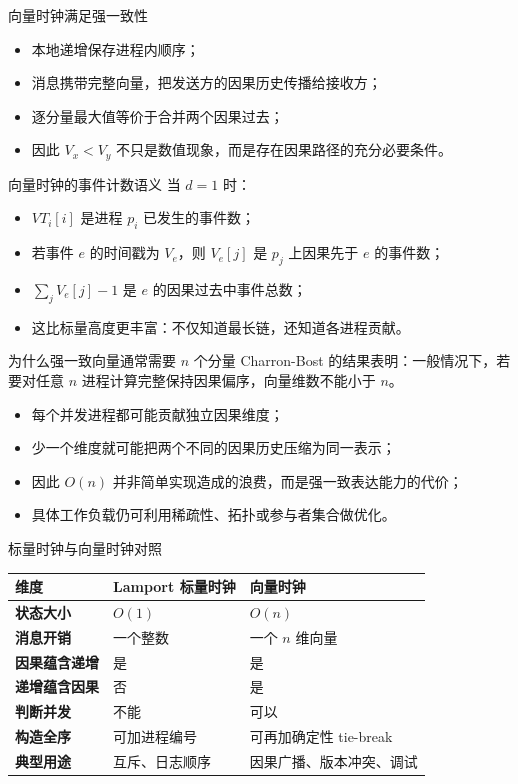 \documentclass[UTF8,fontset=none,aspectratio=169,10pt]{beamer}
\begin{document}
\begin{frame}{向量时钟满足强一致性}
\begin{itemize}
  \item 本地递增保存进程内顺序；
  \item 消息携带完整向量，把发送方的因果历史传播给接收方；
  \item 逐分量最大值等价于合并两个因果过去；
  \item 因此 $V_x<V_y$ 不只是数值现象，而是存在因果路径的充分必要条件。
\end{itemize}
\vfill
{}
\end{frame}

\begin{frame}{向量时钟的事件计数语义}
当 $d=1$ 时：
\begin{itemize}
  \item $VT_i[i]$ 是进程 $p_i$ 已发生的事件数；
  \item 若事件 $e$ 的时间戳为 $V_e$，则 $V_e[j]$ 是 $p_j$ 上因果先于 $e$ 的事件数；
  \item $\sum_j V_e[j]-1$ 是 $e$ 的因果过去中事件总数；
  \item 这比标量高度更丰富：不仅知道最长链，还知道各进程贡献。
\end{itemize}
\end{frame}

\begin{frame}{为什么强一致向量通常需要 $n$ 个分量}
Charron-Bost 的结果表明：一般情况下，若要对任意 $n$ 进程计算完整保持因果偏序，向量维数不能小于 $n$。
\vfill
\begin{itemize}
  \item 每个并发进程都可能贡献独立因果维度；
  \item 少一个维度就可能把两个不同的因果历史压缩为同一表示；
  \item 因此 $O(n)$ 并非简单实现造成的浪费，而是强一致表达能力的代价；
  \item 具体工作负载仍可利用稀疏性、拓扑或参与者集合做优化。
\end{itemize}
\end{frame}

\begin{frame}{标量时钟与向量时钟对照}
\begin{tabularx}{\linewidth}{>{\bfseries}p{2.5cm}XX}
\toprule
维度 & Lamport 标量时钟 & 向量时钟 \\
\midrule
状态大小 & $O(1)$ & $O(n)$ \\
消息开销 & 一个整数 & 一个 $n$ 维向量 \\
因果蕴含递增 & 是 & 是 \\
递增蕴含因果 & 否 & 是 \\
判断并发 & 不能 & 可以 \\
构造全序 & 可加进程编号 & 可再加确定性 tie-break \\
典型用途 & 互斥、日志顺序 & 因果广播、版本冲突、调试 \\
\bottomrule
\end{tabularx}
\end{frame}
\end{document}
